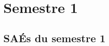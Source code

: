 \documentclass[10pt,french]{article} %
\begin{document}
%
%

%
%

%
%

\newpage


\section{Semestre 1}
\def\sem{A}

\subsection{SAÉs du semestre 1}

\end{document}
